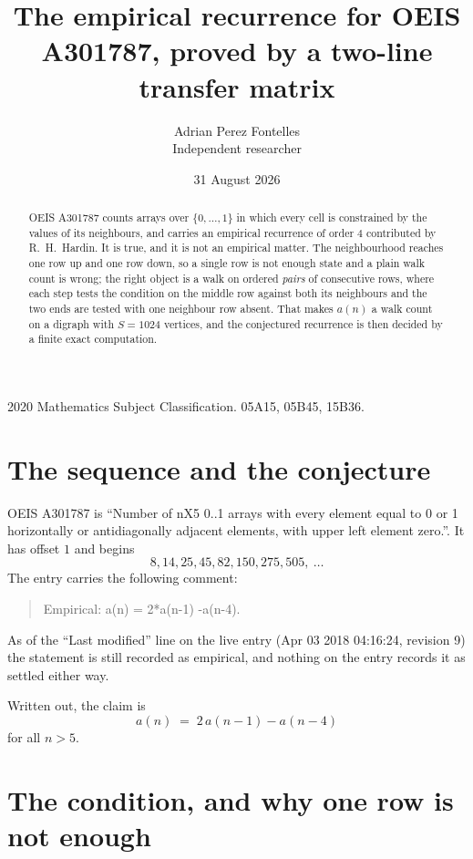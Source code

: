 \documentclass[11pt,a4paper]{article}
\title{The empirical recurrence for OEIS A301787, proved by a two-line transfer matrix}
\author{Adrian Perez Fontelles\\ \small Independent researcher}
\date{31 August 2026}
\theoremstyle{plain}
\theoremstyle{definition}
\begin{document}
\maketitle

\begin{abstract}
OEIS A301787 counts arrays over $\{0,\dots,1\}$ in which every cell is constrained by the
values of its neighbours, and carries an empirical recurrence of order $4$ contributed
by R.~H.~Hardin. It is true, and it is not an empirical matter. The neighbourhood reaches one
row up and one row down, so a single row is not enough state and a plain walk count
is wrong; the right object is a walk on ordered \emph{pairs} of consecutive rows, where
each step tests the condition on the middle row against both its neighbours and the two
ends are tested with one neighbour row absent. That makes $a(n)$ a walk count on a digraph
with $S=1024$ vertices, and the conjectured recurrence is then decided by a finite exact
computation.
\end{abstract}

\noindent\small 2020 Mathematics Subject Classification. 05A15, 05B45, 15B36.\normalsize

\section{The sequence and the conjecture}

OEIS A301787 is ``Number of nX5 0..1 arrays with every element equal to 0 or 1 horizontally or antidiagonally adjacent elements, with upper left element zero.''. It has offset $1$ and begins
\[
8, 14, 25, 45, 82, 150, 275, 505,\ \dots
\]
The entry carries the following comment:
\begin{quote}\small
Empirical: a(n) = 2*a(n-1) -a(n-4).
\end{quote}
As of the ``Last modified'' line on the live entry (Apr 03 2018 04:16:24, revision 9) the statement is
still recorded as empirical, and nothing on the entry records it as settled either way.

Written out, the claim is
\begin{equation}\label{eq:conj}
a(n)\;=\;2\,a(n-1) - a(n-4)
\end{equation}
for all $n>5$.

\section{The condition, and why one row is not enough}
\end{document}
